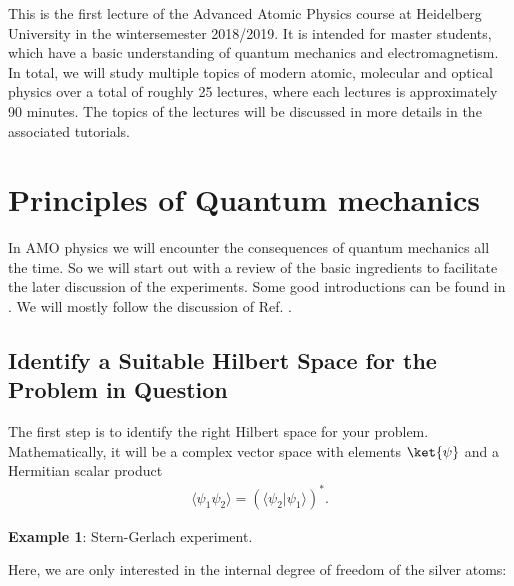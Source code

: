 This is the first lecture of the Advanced Atomic Physics course at Heidelberg University in the wintersemester 2018/2019. It is intended for master students, which have a basic understanding of quantum mechanics and electromagnetism. In total, we will study multiple topics of modern atomic, molecular and optical physics over a total of roughly 25 lectures, where each lectures is approximately 90 minutes. The topics of the lectures will be discussed in more details in the associated tutorials. 

\section{Principles of Quantum mechanics}
In AMO physics we will encounter the consequences of quantum mechanics all the time. So we will start out with a review of the basic ingredients to facilitate the later discussion of the experiments. Some good introductions can be found in \cite{2002, 2006} \cite{1}\cite{2}. We will mostly follow the discussion of Ref. \cite{2006}.

\subsection{Identify a Suitable Hilbert Space for the Problem in Question}
The first step is to identify the right Hilbert space for your problem. Mathematically, it will be a complex vector space with elements $\ket{\psi}$ and a Hermitian scalar product
\begin{align}
				\langle\psi_1 \psi_2\rangle=(\langle{\psi_2}| \psi_1\rangle)^*.
\end{align}

\textbf{Example 1}: Stern-Gerlach experiment.

Here, we are only interested in the internal degree of freedom of the silver atoms:

